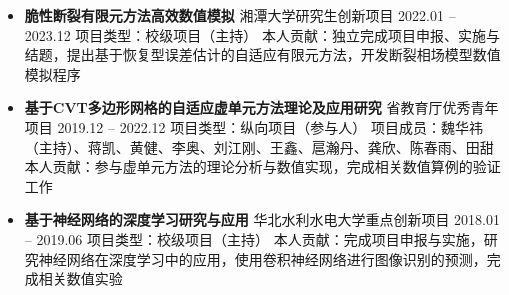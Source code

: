 \documentclass{resume}
\begin{document}
{\begin{itemize}
        \item \textbf{脆性断裂有限元方法高效数值模拟}\newline
        湘潭大学研究生创新项目 \hfill 2022.01 -- 2023.12\newline
        项目类型：校级项目（主持）\newline
        本人贡献：独立完成项目申报、实施与结题，提出基于恢复型误差估计的自适应有限元方法，开发断裂相场模型数值模拟程序

        \item \textbf{基于CVT多边形网格的自适应虚单元方法理论及应用研究}\newline
        省教育厅优秀青年项目 \hfill 2019.12 -- 2022.12\newline
        项目类型：纵向项目（参与人）\newline
        项目成员：魏华祎（主持）、蒋凯、黄健、李奥、刘江刚、王鑫、扈瀚丹、龚欣、陈春雨、田甜\newline
        本人贡献：参与虚单元方法的理论分析与数值实现，完成相关数值算例的验证工作
        
        \item \textbf{基于神经网络的深度学习研究与应用}\newline
        华北水利水电大学重点创新项目 \hfill 2018.01 -- 2019.06\newline
        项目类型：校级项目（主持）\newline
        本人贡献：完成项目申报与实施，研究神经网络在深度学习中的应用，使用卷积神经网络进行图像识别的预测，完成相关数值实验
    \end{itemize}
}



\end{document}

